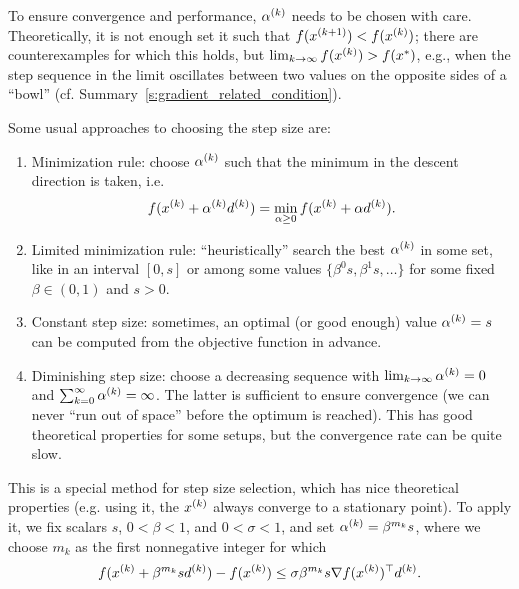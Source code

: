 \documentclass{article}
\begin{document}

To ensure convergence and performance, \(\kth{\alpha}\) needs to be chosen with care.
Theoretically, it is not enough set it such that \(f(\kth[k+1]{x}) < f(\kth{x})\); there are
counterexamples for which this holds, but \(\lim_{k \to \infty} f(\kth{x}) > f(x^*)\), e.g., when
the step sequence in the limit oscillates between two values on the opposite sides of a ``bowl''
(cf. Summary~\ref{s:gradient_related_condition}).

Some usual approaches to choosing the step size are:
\begin{enumerate}
\item Minimization rule: choose \(\kth{\alpha}\) such that the minimum in the descent direction is
  taken, i.e.
  \begin{equation*}
    f(\kth{x} + \kth{\alpha}\kth{d}) = \min_{\alpha \geq 0} f(\kth{x} + \alpha\kth{d}).
  \end{equation*}
\item Limited minimization rule: ``heuristically'' search the best \(\kth{\alpha}\) in some set,
  like in an interval \([0, s]\) or among some values \(\{\beta^0 s, \beta^1 s, \ldots \}\) for some
  fixed \(\beta \in (0, 1)\) and \(s > 0\).
\item Constant step size: sometimes, an optimal (or good enough) value \(\kth{\alpha} = s\) can be
  computed from the objective function in advance.
\item Diminishing step size: choose a decreasing sequence with
  \(\lim_{k \to \infty} \kth{\alpha} = 0\) and \(\sum_{k = 0}^{\infty} \kth{\alpha} = \infty\).  The
  latter is sufficient to ensure convergence (we can never ``run out of space'' before the optimum
  is reached).  This has good theoretical properties for some setups, but the convergence rate can
  be quite slow.
\end{enumerate}



This is a special method for step size selection, which has nice theoretical properties (e.g. using
it, the \(\kth{x}\) always converge to a stationary point).  To apply it, we fix scalars \(s\), \(0 <
\beta < 1\), and \(0 < \sigma < 1\), and set \(\kth{\alpha} = \beta^{m_k} s\), where we choose
\(m_k\) as the first nonnegative integer for which
\begin{equation*}
  f(\kth{x} + \beta^{m_k} s \kth{d}) - f(\kth{x}) \leq \sigma \beta^{m_k} s \nabla \T{f(\kth{x})} \kth{d}.
\end{equation*}
\end{document}
